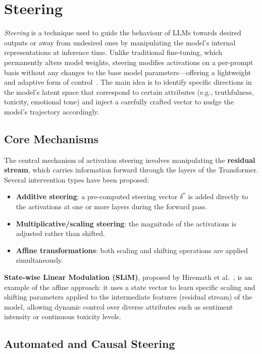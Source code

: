 \section{Steering}


\textit{Steering} is a technique used to guide the behaviour of LLMs towards desired outputs or
away from undesired ones by manipulating the model's internal representations at inference time.
Unlike traditional fine-tuning, which permanently alters model weights, steering modifies
activations on a per-prompt basis without any changes to the base model parameters—offering a
lightweight and adaptive form of control~\cite{ITI}. The main idea is to identify specific
directions in the model's latent space that correspond to certain attributes (e.g., truthfulness,
toxicity, emotional tone) and inject a carefully crafted vector to nudge the model's trajectory
accordingly.


\subsection{Core Mechanisms}

The central mechanism of activation steering involves manipulating the \textbf{residual stream},
which carries information forward through the layers of the Transformer. Several intervention
types have been proposed:

\begin{itemize}
    \item \textbf{Additive steering}: a pre-computed steering vector \(\delta^*\) is added
          directly to the activations at one or more layers during the forward pass.
    \item \textbf{Multiplicative/scaling steering}: the magnitude of the activations is adjusted
          rather than shifted.
    \item \textbf{Affine transformations}: both scaling and shifting operations are applied
          simultaneously.
\end{itemize}

\textbf{State-wise Linear Modulation (SLiM)}, proposed by Hiremath et al.~\cite{SLiM}, is an
example of the affine approach: it uses a state vector to learn specific scaling and shifting
parameters applied to the intermediate features (residual stream) of the model, allowing dynamic
control over diverse attributes such as sentiment intensity or continuous toxicity levels.


\subsection{Automated and Causal Steering}

